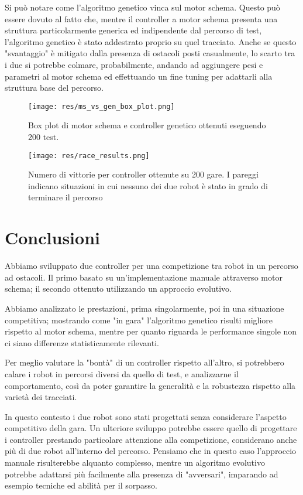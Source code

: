 \documentclass[UTF8]{article}
\begin{document}
Si può notare come l'algoritmo genetico vinca sul motor schema.
Questo può essere dovuto al fatto che, mentre il controller a motor schema presenta una struttura particolarmente generica ed indipendente dal percorso di test, l'algoritmo genetico è stato addestrato proprio su quel tracciato.
Anche se questo "svantaggio" è mitigato dalla presenza di ostacoli posti casualmente, lo scarto tra i due si potrebbe colmare, probabilmente, andando ad aggiungere pesi e parametri al motor schema ed effettuando un fine tuning per adattarli alla struttura base del percorso.

\begin{figure}[h]
\centering
\texttt{[image: res/ms\_vs\_gen\_box\_plot.png]}
\caption{Box plot di motor schema e controller genetico ottenuti eseguendo 200 test.}
\label{fig:ms_vs_cross}
\end{figure}

\begin{figure}
\centering
\texttt{[image: res/race\_results.png]}
\caption{Numero di vittorie per controller ottenute su 200 gare. I pareggi indicano situazioni in cui nessuno dei due robot è stato in grado di terminare il percorso}
\label{fig:winners}
\end{figure}

\newpage

\section{Conclusioni}
Abbiamo sviluppato due controller per una competizione tra robot in un percorso ad ostacoli. Il primo basato su un'implementazione manuale attraverso motor schema; il secondo ottenuto utilizzando un approccio evolutivo. 

Abbiamo analizzato le prestazioni, prima singolarmente, poi in una situazione competitiva;
mostrando come "in gara" l'algoritmo genetico risulti migliore rispetto al motor schema, mentre per quanto riguarda le performance singole non ci siano differenze statisticamente rilevanti.

Per meglio valutare la "bontà" di un controller rispetto all'altro, si potrebbero calare i robot in percorsi diversi da quello di test, e analizzarne il comportamento, così da poter garantire la generalità e la robustezza rispetto alla varietà dei tracciati.

In questo contesto i due robot sono stati progettati senza considerare l'aspetto competitivo della gara.
Un ulteriore sviluppo potrebbe essere quello di progettare i controller prestando particolare attenzione alla competizione, considerano anche più di due robot all'interno del percorso.
Pensiamo che in questo caso l'approccio manuale risulterebbe alquanto complesso, mentre un algoritmo evolutivo potrebbe adattarsi più facilmente alla presenza di "avversari", imparando ad esempio tecniche ed abilità per il sorpasso.




\clearpage




\end{document}
